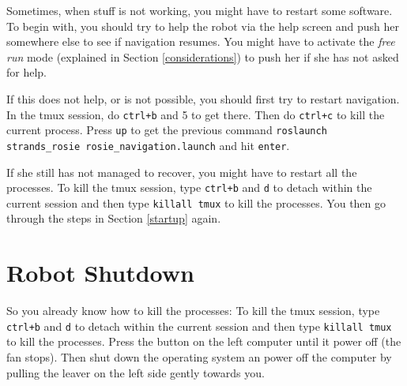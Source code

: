 \documentclass[a4paper,11pt]{article}
\begin{document}
Sometimes, when stuff is not working, you might have to restart some software. To begin with, you should try to help the robot via the help screen and push her somewhere else to see if navigation resumes. You might have to activate the \textit{free run} mode (explained in Section \ref{considerations}) to push her if she has not asked for help.

If this does not help, or is not possible, you should first try to restart navigation. In the tmux session, do \texttt{ctrl+b} and 5 to get there. Then do \texttt{ctrl+c} to kill the current process. Press \texttt{up} to get the previous command \texttt{roslaunch strands\_rosie rosie\_navigation.launch} and hit \texttt{enter}.

If she still has not managed to recover, you might have to restart all the processes. To kill the tmux session, type \texttt{ctrl+b} and \texttt{d} to detach within the current session and then type \texttt{killall tmux} to kill the processes. You then go through the steps in Section \ref{startup} again.

\section{Robot Shutdown}
\label{shutdown}

So you already know how to kill the processes: To kill the tmux session, type \texttt{ctrl+b} and \texttt{d} to detach within the current session and then type \texttt{killall tmux} to kill the processes.
Press the button on the left computer until it power off (the fan stops).
Then shut down the operating system an power off the computer by pulling
the leaver on the left side gently towards you.
\end{document}
